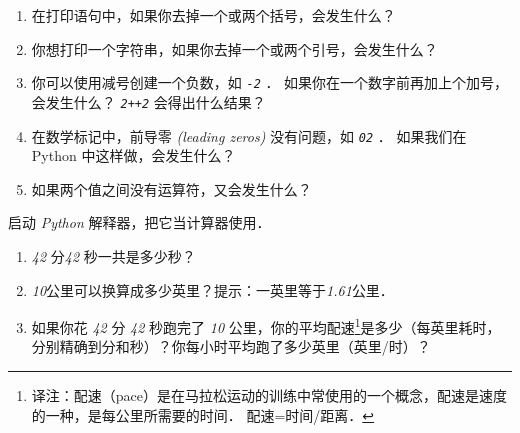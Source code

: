 \begin{exercise}
\begin{enumerate}

\item 在打印语句中，如果你去掉一个或两个括号，会发生什么？

\item 你想打印一个字符串，如果你去掉一个或两个引号，会发生什么？

\item 你可以使用减号创建一个负数，如 {\em \lstinline{-2}} ． 如果你在一个数字前再加上个加号，会发生什么？ {\em \lstinline{2++2}} 会得出什么结果？

\item 在数学标记中，前导零 {\em (leading zeros)} 没有问题，如 {\em \lstinline{02}} ． 如果我们在 Python 中这样做，会发生什么？

\item 如果两个值之间没有运算符，又会发生什么？

\end{enumerate}

\end{exercise}



\begin{exercise}



启动 {\em Python} 解释器，把它当计算器使用．

\begin{enumerate}

\item {\em 42} 分{\em 42} 秒一共是多少秒？

\item {\em 10}公里可以换算成多少英里？提示：一英里等于{\em 1.61}公里．

\item 如果你花 {\em 42} 分 {\em 42} 秒跑完了 {\em 10} 公里，你的平均配速\footnote{译注：配速（pace）是在马拉松运动的训练中常使用的一个概念，配速是速度的一种，是每公里所需要的时间． 配速=时间/距离． }是多少（每英里耗时，分别精确到分和秒）？你每小时平均跑了多少英里（英里/时）？

  
  

\end{enumerate}

\end{exercise}